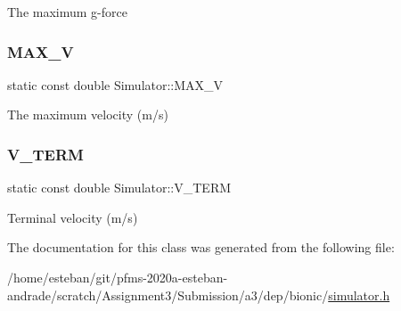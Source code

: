 The maximum g-\/force \mbox{\label{classSimulator_aa4e6371b6605ae050de558167256a9d0}} 
\subsubsection{\texorpdfstring{M\+A\+X\+\_\+V}{MAX\_V}}
{\footnotesize\ttfamily static const double Simulator\+::\+M\+A\+X\+\_\+V\hspace{0.3cm}{\ttfamily [static]}}

The maximum velocity (m/s) \mbox{\label{classSimulator_a8250a5fd76149109333aed2c91fa846e}} 
\subsubsection{\texorpdfstring{V\+\_\+\+T\+E\+RM}{V\_TERM}}
{\footnotesize\ttfamily static const double Simulator\+::\+V\+\_\+\+T\+E\+RM\hspace{0.3cm}{\ttfamily [static]}}

Terminal velocity (m/s) 

The documentation for this class was generated from the following file\+:\begin{DoxyCompactItemize}
\item 
/home/esteban/git/pfms-\/2020a-\/esteban-\/andrade/scratch/\+Assignment3/\+Submission/a3/dep/bionic/\hyperlink{bionic_2simulator_8h}{simulator.\+h}\end{DoxyCompactItemize}

